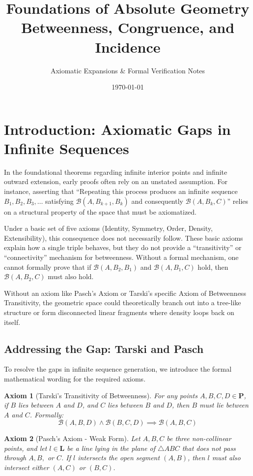 \documentclass[12pt, letterpaper]{article}
\title{\textbf{Foundations of Absolute Geometry}\\ \Large Betweenness, Congruence, and Incidence}
\author{Axiomatic Expansions \& Formal Verification Notes}
\date{\today}
\newtheorem{axiom}{Axiom}
\theoremstyle{definition}
\newcommand{\B}{\mathcal{B}}
\newcommand{\Pset}{\mathbf{P}}
\newcommand{\Lset}{\mathbf{L}}
\begin{document}
\maketitle
\tableofcontents
\vspace{1cm}

\section{Introduction: Axiomatic Gaps in Infinite Sequences}
In the foundational theorems regarding infinite interior points and infinite outward extension, early proofs often rely on an unstated assumption. For instance, asserting that ``Repeating this process produces an infinite sequence $B_1, B_2, B_3, \dots$ satisfying $\B(A, B_{k+1}, B_k)$ and consequently $\B(A, B_k, C)$'' relies on a structural property of the space that must be axiomatized.

Under a basic set of five axioms (Identity, Symmetry, Order, Density, Extensibility), this consequence does not necessarily follow. These basic axioms explain how a single triple behaves, but they do not provide a ``transitivity'' or ``connectivity'' mechanism for betweenness. Without a formal mechanism, one cannot formally prove that if $\B(A, B_2, B_1)$ and $\B(A, B_1, C)$ hold, then $\B(A, B_2, C)$ must also hold.

Without an axiom like Pasch's Axiom or Tarski's specific Axiom of Betweenness Transitivity, the geometric space could theoretically branch out into a tree-like structure or form disconnected linear fragments where density loops back on itself.

\subsection{Addressing the Gap: Tarski and Pasch}
To resolve the gaps in infinite sequence generation, we introduce the formal mathematical wording for the required axioms.

\begin{axiom}[Tarski's Transitivity of Betweenness]
    For any points $A, B, C, D \in \Pset$, if $B$ lies between $A$ and $D$, and $C$ lies between $B$ and $D$, then $B$ must lie between $A$ and $C$. Formally:
    \[ \B(A,B,D) \land \B(B,C,D) \implies \B(A,B,C) \]
\end{axiom}

\begin{axiom}[Pasch's Axiom - Weak Form]
    Let $A, B, C$ be three non-collinear points, and let $l \in \Lset$ be a line lying in the plane of $\triangle ABC$ that does not pass through $A, B,$ or $C$. If $l$ intersects the open segment $(A,B)$, then $l$ must also intersect either $(A,C)$ or $(B,C)$.
\end{axiom}
\end{document}
